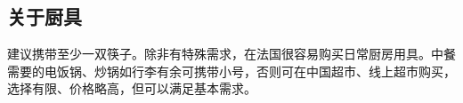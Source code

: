 \subsection{关于厨具}

建议携带至少一双筷子。除非有特殊需求，在法国很容易购买日常厨房用具。中餐需要的电饭锅、炒锅如行李有余可携带小号，否则可在中国超市、线上超市购买，选择有限、价格略高，但可以满足基本需求。
